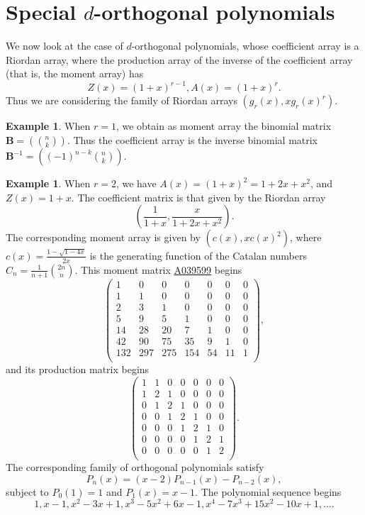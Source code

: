 \documentclass[12pt,reqno]{article}
\theoremstyle{definition}
\newtheorem{example}[theorem]{Example}
\newcommand{\seqnum}[1]{\href{http://oeis.org/#1}{\underline{#1}}}
\begin{document}
\section{Special $d$-orthogonal polynomials}
We now look at the case of $d$-orthogonal polynomials, whose coefficient array is a Riordan array, where the production array of the inverse of the coefficient array (that is, the moment array) has
$$Z(x)=(1+x)^{r-1}, A(x)=(1+x)^r.$$ Thus we are considering the family of Riordan arrays $(g_r(x), xg_r(x)^r)$.
\begin{example}  When $r=1$, we obtain as moment array the binomial matrix $\mathbf{B}=\left(\binom{n}{k}\right)$. Thus the coefficient array is the inverse binomial matrix $\mathbf{B}^{-1}=\left((-1)^{n-k}\binom{n}{k}\right)$.
\end{example}
\begin{example} When $r=2$, we have $A(x)=(1+x)^2=1+2x+x^2$, and $Z(x)=1+x$. The coefficient matrix is that given by the Riordan array
$$\left(\frac{1}{1+x}, \frac{x}{1+2x+x^2}\right).$$ The corresponding moment array is given by $(c(x), xc(x)^2)$, where $c(x)=\frac{1-\sqrt{1-4x}}{2x}$ is the generating function of the Catalan numbers $C_n=\frac{1}{n+1}\binom{2n}{n}$. This moment matrix \seqnum{A039599} begins
$$\left(
\begin{array}{ccccccc}
1& 0 & 0 & 0 & 0 & 0 & 0 \\
1 & 1 & 0 & 0 & 0 & 0 & 0 \\
2 & 3 & 1 & 0 & 0 & 0 & 0 \\
5 & 9 & 5 & 1 & 0 & 0 & 0 \\
14 &28 & 20 & 7 & 1 & 0 & 0 \\
42 & 90 & 75 & 35 & 9 & 1 & 0 \\
132 & 297 & 275 & 154 & 54 & 11 & 1 \\
\end{array}\right),$$ and its production matrix begins
$$\left(
\begin{array}{ccccccc}
1 &1 & 0 & 0 & 0 & 0 & 0 \\
1 & 2 & 1 & 0 & 0 & 0 & 0 \\
0 & 1 & 2 & 1 & 0 & 0 & 0 \\
0 & 0 & 1 & 2 & 1 & 0 & 0 \\
0 & 0 & 0 & 1 & 2 & 1 & 0 \\
0 & 0 & 0 & 0 & 1 & 2 & 1 \\
0 & 0 & 0 & 0 & 0 & 1 & 2 \\
\end{array}\right).$$
The corresponding family of orthogonal polynomials satisfy
$$P_n(x)=(x-2)P_{n-1}(x)-P_{n-2}(x),$$ subject to $P_0(1)=1$ and $P_1(x)=x-1$. The polynomial sequence begins
$$1, x - 1, x^2 - 3x + 1, x^3 - 5x^2 + 6x - 1, x^4 - 7x^3 + 15x^2 - 10x + 1,\ldots.$$
\end{example}
\end{document}
